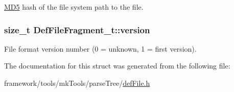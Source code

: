 \hyperlink{class_m_d5}{M\+D5} hash of the file system path to the file. 

\subsubsection[{\texorpdfstring{version}{version}}]{\setlength{\rightskip}{0pt plus 5cm}size\+\_\+t Def\+File\+Fragment\+\_\+t\+::version}\hypertarget{struct_def_file_fragment__t_a6e5fa90d7c9e2ced681794c157604ff4}{}\label{struct_def_file_fragment__t_a6e5fa90d7c9e2ced681794c157604ff4}


File format version number (0 = unknown, 1 = first version). 



The documentation for this struct was generated from the following file\+:\begin{DoxyCompactItemize}
\item 
framework/tools/mk\+Tools/parse\+Tree/\hyperlink{def_file_8h}{def\+File.\+h}\end{DoxyCompactItemize}
